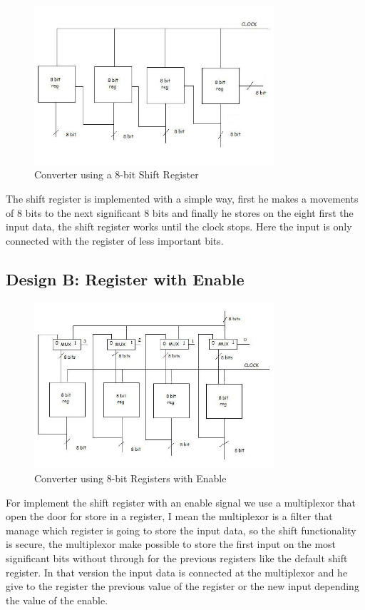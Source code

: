 \documentclass[11pt,a4paper]{article}
\begin{document}
\begin{figure}[htp]
\centering
\includegraphics[width = 3.5in]{./images/shiftregister.jpg}
\caption{Converter using a 8-bit Shift Register}
\end{figure}

The shift register is implemented with a simple way, first he makes a movements of 8 bits to the next significant 8 bits and finally he stores on the eight first the input data, the shift register works until the clock stops. Here the input is only connected with the register of less important bits.

\subsection{Design B: Register with Enable}

\begin{figure}[htp]
\centering
\includegraphics[width = 3.5in]{./images/shiftregisterenable.jpg}
\caption{Converter using 8-bit Registers with Enable}
\end{figure}

For implement the shift register with an enable signal we use a multiplexor that open the door for store in a register, I mean the multiplexor is a filter that manage which register is going to store the input data, so the shift functionality is secure, the multiplexor make possible to store the first input on the most significant bits without through for the previous registers like the default shift register. In that version the input data is connected at the multiplexor and he give to the register the previous value of the register or the new input depending the value of the enable.
\end{document}
